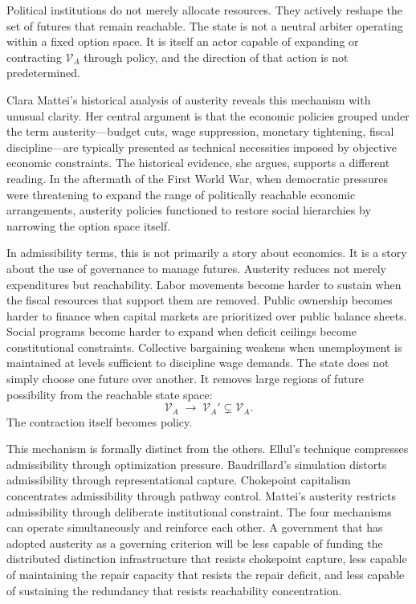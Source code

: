 \documentclass[11pt, letterpaper]{article}
\begin{document}
Political institutions do not merely allocate resources. They actively reshape the set of futures that remain reachable. The state is not a neutral arbiter operating within a fixed option space. It is itself an actor capable of expanding or contracting $\mathcal{V}_A$ through policy, and the direction of that action is not predetermined.

Clara Mattei's historical analysis of austerity reveals this mechanism with unusual clarity. Her central argument is that the economic policies grouped under the term austerity---budget cuts, wage suppression, monetary tightening, fiscal discipline---are typically presented as technical necessities imposed by objective economic constraints. The historical evidence, she argues, supports a different reading. In the aftermath of the First World War, when democratic pressures were threatening to expand the range of politically reachable economic arrangements, austerity policies functioned to restore social hierarchies by narrowing the option space itself.

In admissibility terms, this is not primarily a story about economics. It is a story about the use of governance to manage futures. Austerity reduces not merely expenditures but reachability. Labor movements become harder to sustain when the fiscal resources that support them are removed. Public ownership becomes harder to finance when capital markets are prioritized over public balance sheets. Social programs become harder to expand when deficit ceilings become constitutional constraints. Collective bargaining weakens when unemployment is maintained at levels sufficient to discipline wage demands. The state does not simply choose one future over another. It removes large regions of future possibility from the reachable state space:
\[
  \mathcal{V}_A \;\longrightarrow\; \mathcal{V}_A' \subsetneq \mathcal{V}_A.
\]
The contraction itself becomes policy.

This mechanism is formally distinct from the others. Ellul's technique compresses admissibility through optimization pressure. Baudrillard's simulation distorts admissibility through representational capture. Chokepoint capitalism concentrates admissibility through pathway control. Mattei's austerity restricts admissibility through deliberate institutional constraint. The four mechanisms can operate simultaneously and reinforce each other. A government that has adopted austerity as a governing criterion will be less capable of funding the distributed distinction infrastructure that resists chokepoint capture, less capable of maintaining the repair capacity that resists the repair deficit, and less capable of sustaining the redundancy that resists reachability concentration.
\end{document}
